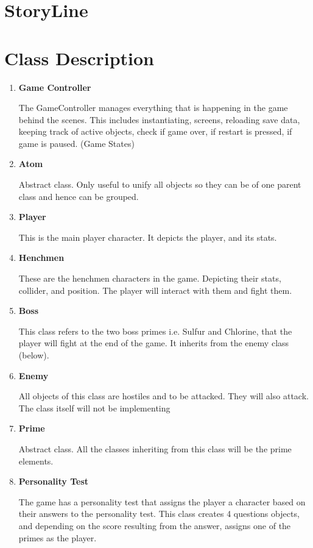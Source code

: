 \documentclass[a4paper, 11pt]{report}
\begin{document}
	\section{StoryLine}
	\section{Class Description}
		\begin{enumerate}
			\item \textbf{Game Controller} 

				The GameController manages everything that is happening in the game behind the scenes. This includes instantiating, screens, reloading save data, keeping track of active objects, check if game over, if restart is pressed, if game is paused. (Game States)
			
			\item \textbf{Atom}
				
				Abstract class. Only useful to unify all objects so they can be of one parent class and hence can be grouped. 

			\item \textbf{Player}
				
				This is the main player character. It depicts the player, and its stats.

			\item \textbf{Henchmen} 
				
				These are the henchmen characters in the game. Depicting their stats, collider, and position. The player will interact with them and fight them.

			\item \textbf{Boss}
				
				This class refers to the two boss primes i.e. Sulfur and Chlorine, that the player will fight at the end of the game. It inherits from the enemy class (below).

			\item \textbf{Enemy}
				
				All objects of this class are hostiles and to be attacked. They will also attack. The class itself will not be implementing 

			\item \textbf{Prime}
				
				Abstract class. All the classes inheriting from this class will be the prime elements. 

			\item \textbf{Personality Test}
				
				The game has a personality test that assigns the player a character based on their answers to the personality test. 
				This class creates 4 questions objects, and depending on the score resulting from the answer, assigns one of the primes as the player.


\end{enumerate}
\end{document}
